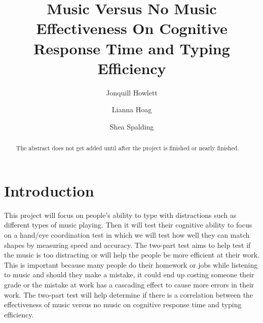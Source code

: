 \documentclass[manuscript, screen, review]{acmart} %
\begin{document}
\title{Music Versus No Music Effectiveness On Cognitive Response Time and Typing Efficiency}

\author{Jonquill Howlett}

\author{Lianna Hoag}

\author{Shea Spalding}

\renewcommand{\shortauthors}{Howlett, Hoag, Spalding} %

\begin{abstract}
The abstract does not get added until after the project is finished or nearly finished.
\end{abstract}

\maketitle

\section{Introduction}
This project will focus on people's ability to type with distractions such as different types of music playing. Then it will test their cognitive ability to focus on a hand/eye coordination test in which we will test how well they can match shapes by measuring speed and accuracy. 
The two-part test aims to help test if the music is too distracting or will help the people be more efficient at their work. 
This is important because many people do their homework or jobs while listening to music and should they make a mistake, it could end up costing someone their grade or the mistake at work has a cascading effect to cause more errors in their work. 
The two-part test will help determine if there is a correlation between the effectiveness of music versus no music on cognitive response time and typing efficiency.
\end{document}
